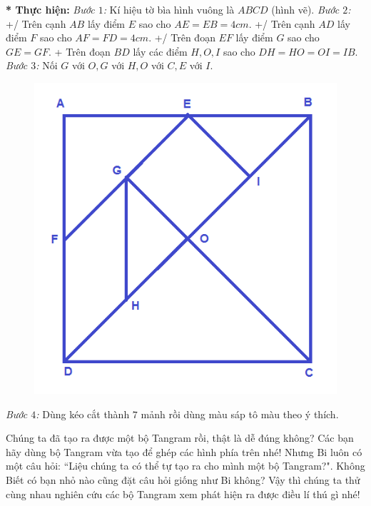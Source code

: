 \begin{multicols}{2}
	\vskip 0.1cm
	\textbf{* Thực hiện:}
	\vskip 0.1cm
	\textit{Bước $1$:} Kí hiệu tờ bìa hình vuông là $ABCD$ (hình vẽ).
	\vskip 0.1cm
	\textit{Bước $2$:} 
	\vskip0.05cm
	+/ Trên cạnh $AB$ lấy điểm $E$ sao cho $AE = EB = 4cm$.
	\vskip 0.1cm
	+/ Trên cạnh $AD$ lấy điểm $F$ sao cho $AF = FD = 4cm$.
	\vskip 0.1cm
	+/ Trên đoạn $EF$ lấy điểm $G$ sao cho $GE= GF$.
	\vskip 0.1cm
	+ Trên đoạn $BD$ lấy các điểm $H, O, I$ sao cho $DH = HO = OI = IB$.
	\vskip 0.1cm
	\textit{Bước $3$:} Nối $G$ với $O, G$ với $H, O$ với $C, E$ với $I$.
	\begin{figure}[H]
		\vspace*{-10pt}
		\centering
		\includegraphics[scale=0.2]{image9}
		\vspace*{-10pt}
	\end{figure}
	\textit{Bước $4$:} Dùng kéo cắt thành $7$ mảnh rồi dùng màu sáp tô màu theo ý thích.
	\end{multicols}
	Chúng ta đã tạo ra được một bộ Tangram rồi, thật là dễ đúng không? Các bạn hãy dùng bộ Tangram vừa tạo để ghép các hình phía trên nhé!
	\vskip 0.1cm
	Nhưng Bi luôn có một câu hỏi: ``Liệu chúng ta có thể tự tạo ra cho mình một bộ Tangram?". Không Biết có bạn nhỏ nào cũng đặt câu hỏi giống như Bi không?
	\vskip 0.1cm
	Vậy thì chúng ta thử cùng nhau nghiên cứu các bộ Tangram xem phát hiện ra được điều lí thú gì nhé!
